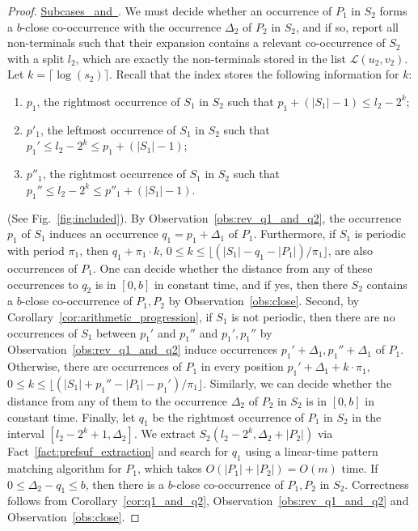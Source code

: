 \begin{proof}
\underline{Subcases~ and~}. We must decide whether an occurrence of $P_1$ in $S_2$ forms a $b$-close co-occurrence with the occurrence $\Delta_2$ of $P_2$ in $S_2$, and if so, report all non-terminals such that their expansion contains a relevant co-occurrence of $S_2$ with a split $l_2$, which are exactly the non-terminals stored in the list $\mathcal{L}(u_2, v_2)$. Let $k = \lceil \log(s_2) \rceil$. Recall that the index stores the following information for $k$: 
\begin{enumerate}
\item $p_1$, the rightmost occurrence of $S_1$ in $S_2$ such that $p_1+(|S_1|-1) \le l_2-2^k$;
\item $p'_1$, the leftmost occurrence of $S_1$ in $S_2$ such that $p_1' \le l_2-2^k \le p_1+(|S_1|-1)$;
\item $p''_1$, the rightmost occurrence of $S_1$ in $S_2$ such that $p_1'' \le l_2-2^k \le p''_1+(|S_1|-1)$.
\end{enumerate}
(See Fig.~\ref{fig:included}). By Observation~\ref{obs:rev_q1_and_q2}, the occurrence $p_1$ of $S_1$ induces an occurrence $q_1 = p_1+\Delta_1$ of $P_1$. Furthermore, if $S_1$ is periodic with period $\pi_1$, then $q_1+\pi_1\cdot k$, $0 \le k \le \lfloor (|S_1|-q_1-|P_1|)/\pi_1 \rfloor$, are also occurrences of $P_1$. One can decide whether the distance from any of these occurrences to $q_2$ is in $[0,b]$ in constant time, and if yes, then there $S_2$ contains a $b$-close co-occurrence of $P_1,P_2$ by Observation~\ref{obs:close}. Second, by Corollary~\ref{cor:arithmetic_progression}, if $S_1$ is not periodic, then there are no occurrences of $S_1$ between $p_1'$ and $p_1''$ and $p_1',p_1''$ by Observation~\ref{obs:rev_q1_and_q2} induce occurrences $p_1'+\Delta_1, p_1''+\Delta_1$ of $P_1$. Otherwise, there are occurrences of $P_1$ in every position $p_1'+\Delta_1+k\cdot\pi_1$, $0 \le k \le \lfloor (|S_1|+p_1''-|P_1|-p_1')/\pi_1 \rfloor$. Similarly, we can decide whether the distance from any of them to the occurrence $\Delta_2$ of $P_2$ in $S_2$ is in $[0,b]$ in constant time. Finally, let $q_1$ be the rightmost occurrence of $P_1$ in $S_2$ in the interval $[l_2-2^k+1, \Delta_2]$. We extract $S_2(l_2-2^k, \Delta_2 +|P_2|)$ via Fact~\ref{fact:prefsuf_extraction} and search for $q_1$ using a linear-time pattern matching algorithm for $P_1$, which takes $O(|P_1|+|P_2|) = O(m)$ time. If $0 \le \Delta_2-q_1\le b$, then there is a $b$-close co-occurrence of $P_1,P_2$ in $S_2$. Correctness follows from Corollary~\ref{cor:q1_and_q2}, Observation~\ref{obs:rev_q1_and_q2} and Observation~\ref{obs:close}. 


\end{proof}

